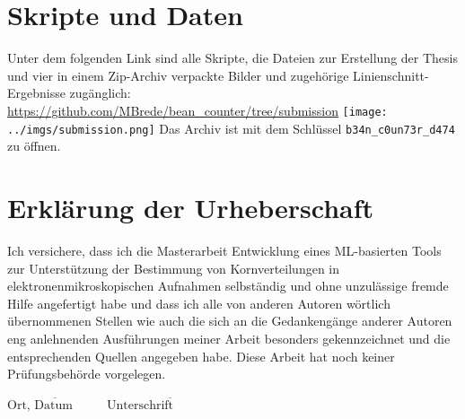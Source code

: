 \chapter*{Skripte und Daten}

Unter dem folgenden Link sind alle Skripte, die Dateien zur Erstellung der Thesis und vier in einem Zip-Archiv verpackte Bilder und zugehörige Linienschnitt-Ergebnisse zugänglich: \newline
\href{https://github.com/MBrede/bean_counter/tree/submission}{https://github.com/MBrede/bean\_counter/tree/submission}\newline
\texttt{[image: ../imgs/submission.png]}\newline
Das Archiv ist mit dem Schlüssel \texttt{b34n\_c0un73r\_d474} zu öffnen.



\chapter*{Erklärung der Urheberschaft}

Ich versichere, dass ich die Masterarbeit \glqq{}Entwicklung eines ML-basierten Tools zur Unterstützung der Bestimmung von Kornverteilungen in elektronenmikroskopischen Aufnahmen\grqq{} selbständig und ohne
unzulässige fremde Hilfe angefertigt habe und dass ich alle von anderen Autoren wörtlich
übernommenen Stellen wie auch die sich an die Gedankengänge anderer Autoren eng
anlehnenden Ausführungen meiner Arbeit besonders gekennzeichnet und die
entsprechenden Quellen angegeben habe.
Diese Arbeit hat noch keiner Prüfungsbehörde vorgelegen.

\vspace{4cm}

\hspace{1cm} $\overline{\text{Ort, Datum} \hspace{1cm}}$ \hspace{3cm} $\overline{\text{Unterschrift} \hspace{2cm}}$

